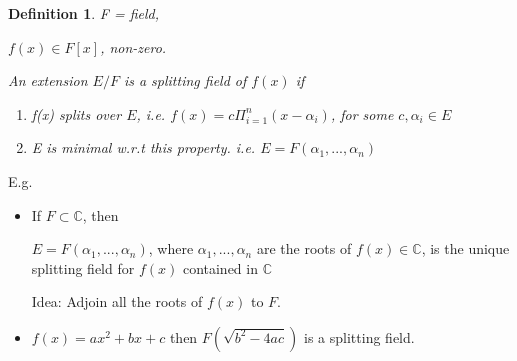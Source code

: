 \documentclass[twoside]{article}
\newcommand{\C}{\mathbb{C}}
\newtheorem{definition}[theorem]{Definition}
\begin{document}
    \begin{definition}
        F = field,

        $f(x) \in F[x]$, non-zero. 

        An extension $E/F$ is a splitting field of $f(x)$ if 
        \begin{enumerate}
            \item f(x) splits over $E$, i.e. $f(x) = c \Pi_{i=1}^n(x - \alpha_i)$, for some $c, \alpha_i \in E$ 
            \item E is minimal w.r.t this property. i.e. $E = F(\alpha_1,...,\alpha_n)$
        \end{enumerate}
    \end{definition}

    E.g. 
    \begin{itemize}
        \item If $F \subset \C$, then  

        $E = F(\alpha_1, ..., \alpha_n)$, where $\alpha_1, ..., \alpha_n$ are the roots of $f(x) \in \C$, is the unique splitting field for $f(x)$ contained in $\C$

        Idea: Adjoin all the roots of $f(x)$ to $F$.
        \item $f(x) = ax^2 + bx + c$ then 
        $F(\sqrt{b^2 - 4ac})$ is a splitting field. 
    \end{itemize}


    
\end{document}
